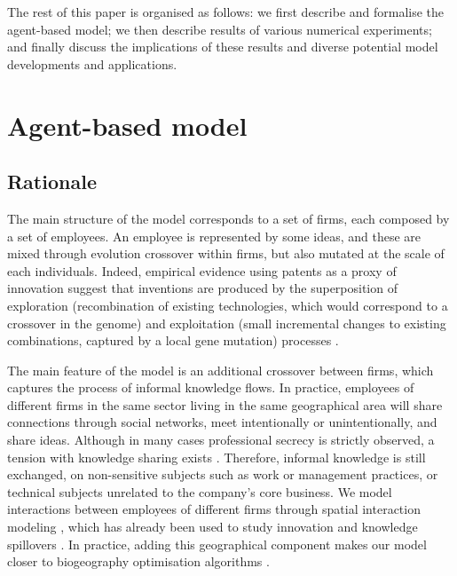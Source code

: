 \documentclass[letterpaper]{article}
\begin{document}
The rest of this paper is organised as follows: we first describe and formalise the agent-based model; we then describe results of various numerical experiments; and finally discuss the implications of these results and diverse potential model developments and applications.


\section{Agent-based model}


\subsection{Rationale}

The main structure of the model corresponds to a set of firms, each composed by a set of employees. An employee is represented by some ideas, and these are mixed through evolution crossover within firms, but also mutated at the scale of each individuals. Indeed, empirical evidence using patents as a proxy of innovation suggest that inventions are produced by the superposition of exploration (recombination of existing technologies, which would correspond to a crossover in the genome) and exploitation (small incremental changes to existing combinations, captured by a local gene mutation) processes \citep{youn2015invention}. 

The main feature of the model is an additional crossover between firms, which captures the process of informal knowledge flows. In practice, employees of different firms in the same sector living in the same geographical area will share connections through social networks, meet intentionally or unintentionally, and share ideas. Although in many cases professional secrecy is strictly observed, a tension with knowledge sharing exists \citep{rouyre2019managing}. Therefore, informal knowledge is still exchanged, on non-sensitive subjects such as work or management practices, or technical subjects unrelated to the company's core business. We model interactions between employees of different firms through spatial interaction modeling \citep{wilson1975some}, which has already been used to study innovation and knowledge spillovers \citep{lesage2007knowledge}. In practice, adding this geographical component makes our model closer to biogeography optimisation algorithms \citep{simon2008biogeography}.
\end{document}
